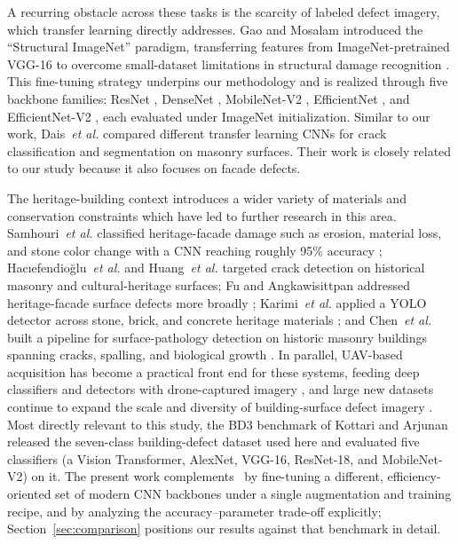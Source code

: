 \documentclass[ASNA, twocolumn]{USG}
\begin{document}
A recurring obstacle across these tasks is the scarcity of labeled defect imagery, which transfer learning directly addresses. Gao and Mosalam introduced the ``Structural ImageNet'' paradigm, transferring features from ImageNet-pretrained VGG-16 \cite{ref23} to overcome small-dataset limitations in structural damage recognition \cite{ref22}. This fine-tuning strategy underpins our methodology and is realized through five backbone families: ResNet \cite{ref24}, DenseNet \cite{ref25}, MobileNet-V2 \cite{ref26}, EfficientNet \cite{ref27}, and EfficientNet-V2 \cite{ref28}, each evaluated under ImageNet initialization. Similar to our work, Dais~\textit{et al.} \cite{ref29} compared different transfer learning CNNs for crack classification and segmentation on masonry surfaces. Their work is closely related to our study because it also focuses on facade defects.

The heritage-building context introduces a wider variety of materials and conservation constraints which have led to further research in this area. Samhouri~\textit{et al.}\cite{ref30} classified heritage-facade damage such as erosion, material loss, and stone color change with a CNN reaching roughly 95\% accuracy ; Hacıefendioğlu~\textit{et al.} \cite{ref31} and Huang~\textit{et al.} \cite{ref34} targeted crack detection on historical masonry and cultural-heritage surfaces; Fu and Angkawisittpan addressed heritage-facade surface defects more broadly \cite{ref32}; Karimi~\textit{et al.} \cite{ref33} applied a YOLO detector across stone, brick, and concrete heritage materials ; and Chen~\textit{et al.} \cite{ref35} built a pipeline for surface-pathology detection on historic masonry buildings spanning cracks, spalling, and biological growth . In parallel, UAV-based acquisition has become a practical front end for these systems, feeding deep classifiers and detectors with drone-captured imagery \cite{ref36,ref37,ref38}, and large new datasets continue to expand the scale and diversity of building-surface defect imagery \cite{ref39}. Most directly relevant to this study, the BD3 benchmark of Kottari and Arjunan~\cite{ref40} released the seven-class building-defect dataset used here and evaluated five classifiers (a Vision Transformer, AlexNet, VGG-16, ResNet-18, and MobileNet-V2) on it. The present work complements~\cite{ref40} by fine-tuning a different, efficiency-oriented set of modern CNN backbones under a single augmentation and training recipe, and by analyzing the accuracy--parameter trade-off explicitly; Section~\ref{sec:comparison} positions our results against that benchmark in detail.
\end{document}
